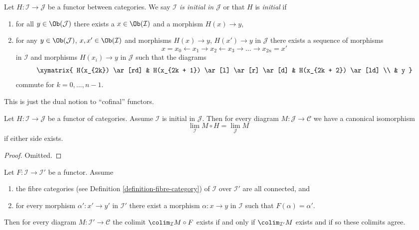 \begin{definition}
\label{definition-initial}
Let $H : \mathcal{I} \to \mathcal{J}$ be a functor between categories.
We say {\it $\mathcal{I}$ is initial in $\mathcal{J}$} or that
$H$ is {\it initial} if
\begin{enumerate}
\item for all $y \in \Ob(\mathcal{J})$ there exists a
$x \in \Ob(\mathcal{I})$ and a morphism $H(x) \to y$,
\item for any $y \in \Ob(\mathcal{J})$, $x , x' \in \Ob(\mathcal{I})$ and
morphisms $H(x) \to y$, $H(x') \to y$ in $\mathcal{J}$
there exists a sequence of morphisms
$$
x = x_0 \leftarrow x_1 \rightarrow x_2 \leftarrow x_3 \rightarrow \ldots
\rightarrow x_{2n} = x'
$$
in $\mathcal{I}$ and morphisms $H(x_i) \to y$ in $\mathcal{J}$
such that the diagrams
$$
\xymatrix{
H(x_{2k}) \ar[rd] &
H(x_{2k + 1}) \ar[l] \ar[r] \ar[d] &
H(x_{2k + 2}) \ar[ld] \\
& y
}
$$
commute for $k = 0, \ldots, n - 1$.
\end{enumerate}
\end{definition}

\noindent
This is just the dual notion to ``cofinal'' functors.

\begin{lemma}
\label{lemma-initial}
Let $H : \mathcal{I} \to \mathcal{J}$ be a functor of categories.
Assume $\mathcal{I}$ is initial in $\mathcal{J}$.
Then for every diagram $M : \mathcal{J} \to \mathcal{C}$ we
have a canonical isomorphism
$$
\lim_\mathcal{I} M \circ H = \lim_\mathcal{J} M
$$
if either side exists.
\end{lemma}

\begin{proof}
Omitted.
\end{proof}

\begin{lemma}
\label{lemma-colimit-constant-connected-fibers}
Let $F : \mathcal{I} \to \mathcal{I}'$ be a functor.
Assume
\begin{enumerate}
\item the fibre categories (see
Definition \ref{definition-fibre-category})
of $\mathcal{I}$ over $\mathcal{I}'$ are all connected, and
\item for every morphism $\alpha' : x' \to y'$ in $\mathcal{I}'$ there
exist a morphism $\alpha : x \to y$ in $\mathcal{I}$ such that
$F(\alpha) = \alpha'$.
\end{enumerate}
Then for every diagram $M : \mathcal{I}' \to \mathcal{C}$
the colimit $\colim_\mathcal{I} M \circ F$ exists if and only
if $\colim_{\mathcal{I}'} M$ exists and if so these colimits
agree.
\end{lemma}

